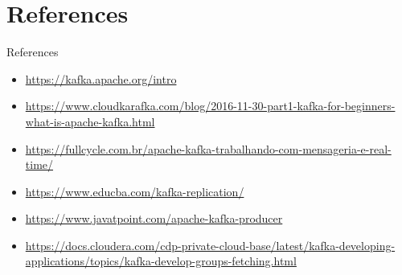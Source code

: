 \documentclass{beamer}
\begin{document}
\section[References]{References}

\begin{frame}{References}
  \begin{itemize}
    \item \url{https://kafka.apache.org/intro}
    \item \url{https://www.cloudkarafka.com/blog/2016-11-30-part1-kafka-for-beginners-what-is-apache-kafka.html}
    \item \url{https://fullcycle.com.br/apache-kafka-trabalhando-com-mensageria-e-real-time/}
    \item \url{https://www.educba.com/kafka-replication/}
    \item \url{https://www.javatpoint.com/apache-kafka-producer}
    \item \url{https://docs.cloudera.com/cdp-private-cloud-base/latest/kafka-developing-applications/topics/kafka-develop-groups-fetching.html}
  \end{itemize}
\end{frame}
\end{document}
